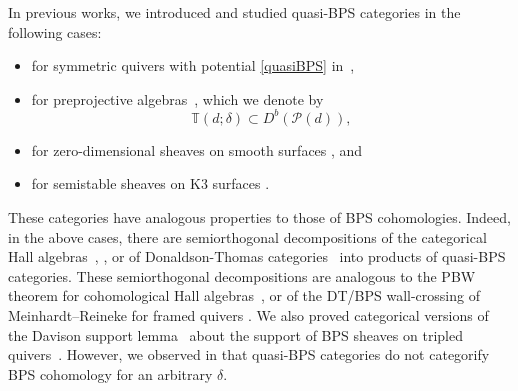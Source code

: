 \documentclass [11pt,oneside,a4paper,mathscr]{amsart}
\theoremstyle{definition}
\begin{document}


In previous works, we introduced and studied quasi-BPS categories in the following cases:
\begin{itemize}
    \item for symmetric quivers with potential \eqref{quasiBPS} in~\cite{P, PTquiver},
    \item for preprojective algebras~\cite{PTzero, PTquiver}, which we denote by
\begin{equation}\label{quasiBPSpreproj}
    \mathbb{T}(d; \delta)\subset D^b(\mathscr{P}(d)),
\end{equation}
\item for zero-dimensional sheaves on smooth surfaces \cite{P0, PT2}, and
\item for semistable sheaves on K3 surfaces \cite{PTK3}.
\end{itemize}
These categories have analogous properties to those of BPS cohomologies. Indeed, in the above cases, 
there are semiorthogonal decompositions of the categorical Hall algebras~\cite[Theorem 1.1]{P}, \cite{P2, PTquiver, PTK3}, or of Donaldson-Thomas categories~\cite{PTzero, PTquiver} into products of quasi-BPS categories. These semiorthogonal decompositions are analogous to the PBW theorem for cohomological Hall algebras~\cite{DM, DHSM}, or of the DT/BPS wall-crossing of
Meinhardt--Reineke for framed quivers \cite{MeRe}. 
We also proved categorical versions of the Davison support lemma~\cite[Lemma~4.1]{Dav}
about the support of BPS sheaves on tripled quivers~\cite{PT1, PTquiver, PTK3}. However, we observed in \cite{PTzero} that quasi-BPS categories do not categorify BPS cohomology for an arbitrary $\delta$. 
\end{document}
